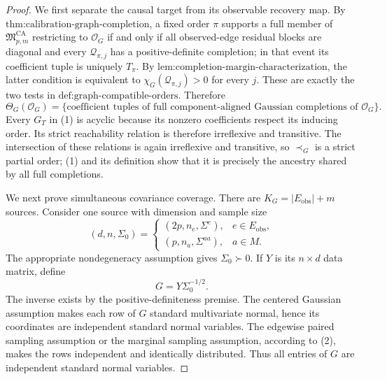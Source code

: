\documentclass{article}
\begin{document}
\begin{proof}
We first separate the causal target from its observable recovery map.  By \(\text{thm:calibration-graph-completion}\), a fixed order \(\pi\) supports a full member of \(\mathfrak M_{p,m}^{\mathrm{CA}}\) restricting to \(\mathcal O_G\) if and only if all observed-edge residual blocks are diagonal and every \(\mathcal Q_{\pi,j}\) has a positive-definite completion; in that event its coefficient tuple is uniquely \(T_\pi\).  By \(\text{lem:completion-margin-characterization}\), the latter condition is equivalent to \(\chi_G(\mathcal Q_{\pi,j})>0\) for every \(j\).  These are exactly the two tests in \(\text{def:graph-compatible-orders}\).  Therefore
\[
\Theta_G(\mathcal O_G)
=\{\text{coefficient tuples of full component-aligned Gaussian completions of }\mathcal O_G\}.
\tag{1}
\]
Every \(G_T\) in (1) is acyclic because its nonzero coefficients respect its inducing order.  Its strict reachability relation is therefore irreflexive and transitive.  The intersection of these relations is again irreflexive and transitive, so \(\prec_G\) is a strict partial order; (1) and its definition show that it is precisely the ancestry shared by all full completions.

We next prove simultaneous covariance coverage.  There are \(K_G=|E_{\mathrm{obs}}|+m\) sources.  Consider one source with dimension and sample size
\[
(d,n,\Sigma_0)=
\begin{cases}
(2p,n_e,\Sigma^e),&e\in E_{\mathrm{obs}},\\
(p,n_a,\Sigma^{aa}),&a\in M.
\end{cases}
\tag{2}
\]
The appropriate nondegeneracy assumption gives \(\Sigma_0\succ0\).  If \(Y\) is its \(n\times d\) data matrix, define
\[
G=Y\Sigma_0^{-1/2}.
\tag{3}
\]
The inverse exists by the positive-definiteness premise.  The centered Gaussian assumption makes each row of \(G\) standard multivariate normal, hence its coordinates are independent standard normal variables.  The edgewise paired sampling assumption or the marginal sampling assumption, according to (2), makes the rows independent and identically distributed.  Thus all entries of \(G\) are independent standard normal variables.


\end{proof}
\end{document}
